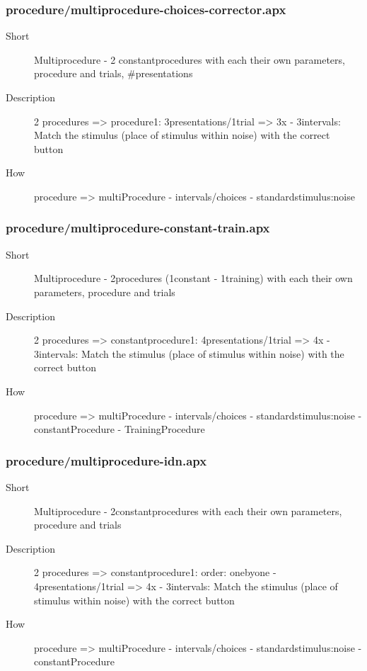 \subsubsection{procedure/multiprocedure-choices-corrector.apx}
\begin{description}
\item[Short] 
 Multiprocedure - 2 constantprocedures with each their own parameters, procedure and trials, \#presentations
\item[Description] 
 2 procedures =\textgreater{} procedure1: 3presentations/1trial =\textgreater{} 3x - 3intervals: Match the stimulus (place of stimulus within noise) with the correct button
\item[How] 
 procedure =\textgreater{} multiProcedure - intervals/choices - standardstimulus:noise
\end{description}

\subsubsection{procedure/multiprocedure-constant-train.apx}
\begin{description}
\item[Short] 
 Multiprocedure - 2procedures (1constant - 1training) with each their own parameters, procedure and trials
\item[Description] 
 2 procedures =\textgreater{} constantprocedure1: 4presentations/1trial =\textgreater{} 4x - 3intervals: Match the stimulus (place of stimulus within noise) with the correct button
\item[How] 
 procedure =\textgreater{} multiProcedure - intervals/choices - standardstimulus:noise - constantProcedure - TrainingProcedure
\end{description}

\subsubsection{procedure/multiprocedure-idn.apx}
\begin{description}
\item[Short] 
 Multiprocedure - 2constantprocedures with each their own parameters, procedure and trials
\item[Description] 
 2 procedures =\textgreater{} constantprocedure1: order: onebyone - 4presentations/1trial =\textgreater{} 4x - 3intervals: Match the stimulus (place of stimulus within noise) with the correct button
\item[How] 
 procedure =\textgreater{} multiProcedure - intervals/choices - standardstimulus:noise - constantProcedure
\end{description}

